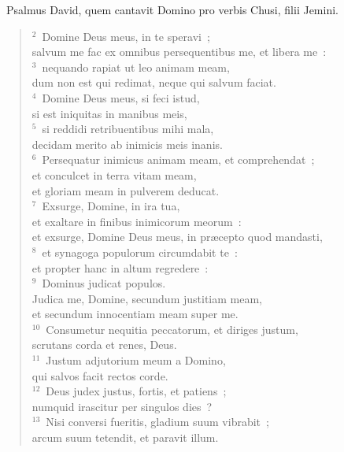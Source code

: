 ~\lettrine[lines=10,image=true,loversize=0.05,lraise=-0.03]{P}{}salmus David, quem cantavit Domino pro verbis Chusi, filii Jemini.
\begin{flushleft}\begin{verse}\vspace{6pt}${}^{2}$~Domine Deus meus, in te speravi~;\\ salvum me fac ex omnibus persequentibus me, et libera me~:\\
${}^{3}$~nequando rapiat ut leo animam meam,\\ dum non est qui redimat, neque qui salvum faciat.\\
${}^{4}$~Domine Deus meus, si feci istud,\\ si est iniquitas in manibus meis,\\
${}^{5}$~si reddidi retribuentibus mihi mala,\\ decidam merito ab inimicis meis inanis.\\
${}^{6}$~Persequatur inimicus animam meam, et comprehendat~;\\ et conculcet in terra vitam meam,\\ et gloriam meam in pulverem deducat.\\
${}^{7}$~Exsurge, Domine, in ira tua,\\ et exaltare in finibus inimicorum meorum~:\\ et exsurge, Domine Deus meus, in pr\ae cepto quod mandasti,\\
${}^{8}$~et synagoga populorum circumdabit te~:\\ et propter hanc in altum regredere~:\\
${}^{9}$~Dominus judicat populos.\\ Judica me, Domine, secundum justitiam meam,\\ et secundum innocentiam meam super me.\\
${}^{10}$~Consumetur nequitia peccatorum, et diriges justum,\\ scrutans corda et renes, Deus.\\
${}^{11}$~Justum adjutorium meum a Domino,\\ qui salvos facit rectos corde.\\
${}^{12}$~Deus judex justus, fortis, et patiens~;\\ numquid irascitur per singulos dies~?\\
${}^{13}$~Nisi conversi fueritis, gladium suum vibrabit~;\\ arcum suum tetendit, et paravit illum.\\

\end{verse}
\end{flushleft}
